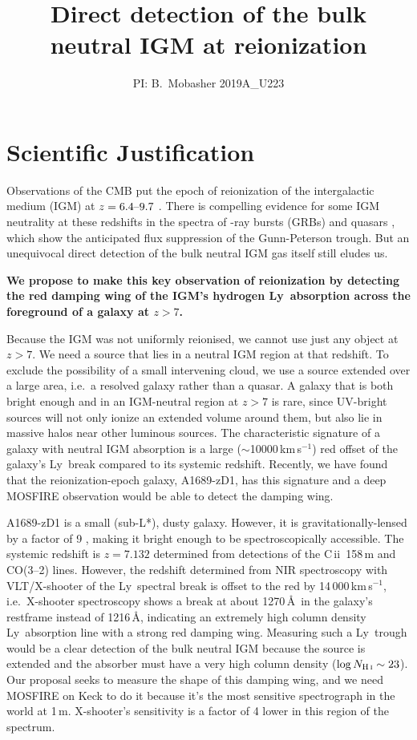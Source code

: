 \documentclass[letter,12pt]{article}
\title{\vspace*{-2cm}Direct detection of the bulk neutral IGM at reionization}
\author{PI: B.~Mobasher 2019A\_U223}
\date{}
\newcommand{\lya}{Ly\textalpha}
\newcommand{\cii}{C\,{\sc ii}}
\begin{document}
\maketitle

\section{Scientific Justification}

Observations of the CMB put the epoch of reionization of the intergalactic
medium (IGM) at \(z=6.4\textup{--}9.7\) \citep{2016A&A...596A.108P}. There is
compelling evidence for some IGM neutrality at these redshifts in the spectra of
\textgamma-ray bursts (GRBs) and quasars \citep[e.g.][]{2006AJ....132..117F},
which show the anticipated flux suppression of the Gunn-Peterson trough. But an
unequivocal direct detection of the bulk neutral IGM gas itself still eludes us.

\textbf{We propose to make this key observation of reionization by detecting the
red damping wing of the IGM's hydrogen \lya\ absorption across the foreground of
a galaxy at \(z>7\).}

Because the IGM was not uniformly reionised, we cannot use just any object at
\(z>7\). We need a source that lies in a neutral IGM region at that
redshift. To exclude the possibility of a small intervening cloud,
we use a source extended over a large area, i.e.\ a resolved galaxy rather than
a quasar. A galaxy that is both bright enough and in an IGM-neutral
region at \(z>7\) is rare, since UV-bright sources will not only ionize an
extended volume around them, but also lie in massive halos near other
luminous sources. The characteristic signature of a galaxy with neutral IGM
absorption is a large (\(\sim\)10000\,km\,s\(^{-1}\)) red offset of the galaxy's
\lya\ break compared to its systemic redshift. Recently, we have found that the
reionization-epoch galaxy, A1689-zD1, has this signature and a deep MOSFIRE
observation would be able to detect the damping wing.

A1689-zD1 is a small (sub-L*), dusty galaxy. However, it is
gravitationally-lensed by a factor of 9 \citep{2008ApJ...678..647B}, making it
bright enough to be spectroscopically accessible. The systemic redshift is
\(z=7.132\) determined from detections of the \cii\ 158\,{\textmu}m and CO(3--2)
lines. However, the redshift determined from NIR spectroscopy with VLT/X-shooter
of the \lya\ spectral break is offset to the red by 14\,000\,km\,s\(^{-1}\),
i.e.\ X-shooter spectroscopy shows a break at about 1270\,\AA\ in the galaxy's
restframe instead of 1216\,\AA, indicating an extremely high column density
\lya\ absorption line with a strong red damping wing. Measuring such a \lya\
trough would be a clear detection of the bulk neutral IGM because the source is
extended and the absorber must have a very high column density
(\(\log{N_\mathrm{H\,\textsc{i}}}\sim23\)). Our proposal seeks to measure the
shape of this damping wing, and we need MOSFIRE on Keck to do it because it's
the most sensitive spectrograph in the world at 1\,{\textmu}m. X-shooter's
sensitivity is a factor of 4 lower in this region of the spectrum.
\end{document}
